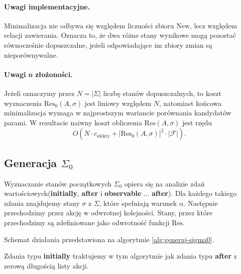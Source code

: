 \documentclass[11pt,a4paper]{article}
\theoremstyle{definition}
\begin{document}
\paragraph{Uwagi implementacyjne.}
Minimalizacja nie odbywa się względem liczności zbioru $\mathrm{New}$, lecz względem relacji zawierania. Oznacza to, że dwa różne stany wynikowe mogą pozostać równocześnie dopuszczalne, jeżeli odpowiadające im zbiory zmian są nieporównywalne.

\paragraph{Uwagi o złożoności.}
Jeżeli oznaczymy przez $N = |\Sigma|$ liczbę stanów dopuszczalnych, to koszt wyznaczenia $\mathrm{Res}_0(A,\sigma)$ jest liniowy względem $N$, natomiast końcowa minimalizacja wymaga w najprostszym wariancie porównania kandydatów parami. W rezultacie naiwny koszt obliczenia $\mathrm{Res}(A,\sigma)$ jest rzędu
\[
O(N \cdot c_{\text{efekty}} + |\mathrm{Res}_0(A,\sigma)|^2 \cdot |\mathcal{F}|).
\]

\subsection{Generacja \texorpdfstring{$\Sigma_0$}{Sigma0}}

Wyznaczanie stanów początkowych $\Sigma_0$ opiera się na analizie zdań wartościowych(\textbf{initially}, \textbf{after} i \textbf{observable} ... \textbf{after}). Dla każdego takiego zdania znajdujemy stany $\sigma$ z $\Sigma$, które spełniają warunek $\alpha$. Następnie przechodzimy przez akcję w odwrotnej kolejności. Stany, przez które przechodzimy są zdefiniowane jako odwrotność funkcji $\mathrm{Res}$.

Schemat działania przedstawiona na algorytmie \ref{alg:generuj-sigma0}.

Zdania typu \textbf{initially} traktujemy w tym algorytmie jak zdania typu \textbf{after} z zerową długością listy akcji.
\end{document}
